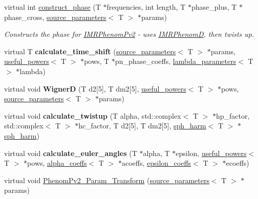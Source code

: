 \begin{DoxyCompactItemize}
virtual int \hyperlink{classIMRPhenomPv2_a05877c187dedd47f2479939907b4b2e9}{construct\+\_\+phase} (T $\ast$frequencies, int length, T $\ast$phase\+\_\+plus, T $\ast$phase\+\_\+cross, \hyperlink{structsource__parameters}{source\+\_\+parameters}$<$ T $>$ $\ast$params)
\begin{DoxyCompactList}\small\item\em Constructs the phase for \hyperlink{classIMRPhenomPv2}{I\+M\+R\+Phenom\+Pv2} -\/ uses \hyperlink{classIMRPhenomD}{I\+M\+R\+PhenomD}, then twists up. \end{DoxyCompactList}\item 
\mbox{\label{classIMRPhenomPv2_a326eaa63c365113abfa37830f0a0f42f}} 
virtual T {\bfseries calculate\+\_\+time\+\_\+shift} (\hyperlink{structsource__parameters}{source\+\_\+parameters}$<$ T $>$ $\ast$params, \hyperlink{structuseful__powers}{useful\+\_\+powers}$<$ T $>$ $\ast$pows, T $\ast$pn\+\_\+phase\+\_\+coeffs, \hyperlink{structlambda__parameters}{lambda\+\_\+parameters}$<$ T $>$ $\ast$lambda)
\item 
\mbox{\label{classIMRPhenomPv2_abd66fb1738b26466d28d8f4050d4207c}} 
virtual void {\bfseries WignerD} (T d2\mbox{[}5\mbox{]}, T dm2\mbox{[}5\mbox{]}, \hyperlink{structuseful__powers}{useful\+\_\+powers}$<$ T $>$ $\ast$pows, \hyperlink{structsource__parameters}{source\+\_\+parameters}$<$ T $>$ $\ast$params)
\item 
\mbox{\label{classIMRPhenomPv2_a2f7dc5cbc5451036e15b7eaa3e170f96}} 
virtual void {\bfseries calculate\+\_\+twistup} (T alpha, std\+::complex$<$ T $>$ $\ast$hp\+\_\+factor, std\+::complex$<$ T $>$ $\ast$hc\+\_\+factor, T d2\mbox{[}5\mbox{]}, T dm2\mbox{[}5\mbox{]}, \hyperlink{structsph__harm}{sph\+\_\+harm}$<$ T $>$ $\ast$\hyperlink{structsph__harm}{sph\+\_\+harm})
\item 
\mbox{\label{classIMRPhenomPv2_aba929d7ceebe4ddbfd13088c1ac0596b}} 
virtual void {\bfseries calculate\+\_\+euler\+\_\+angles} (T $\ast$alpha, T $\ast$epsilon, \hyperlink{structuseful__powers}{useful\+\_\+powers}$<$ T $>$ $\ast$pows, \hyperlink{structalpha__coeffs}{alpha\+\_\+coeffs}$<$ T $>$ $\ast$acoeffs, \hyperlink{structepsilon__coeffs}{epsilon\+\_\+coeffs}$<$ T $>$ $\ast$ecoeffs)
\item 
virtual void \hyperlink{classIMRPhenomPv2_ae8f253a1feebc43995dd5d052c856e05}{Phenom\+Pv2\+\_\+\+Param\+\_\+\+Transform} (\hyperlink{structsource__parameters}{source\+\_\+parameters}$<$ T $>$ $\ast$params)

\end{DoxyCompactItemize}
